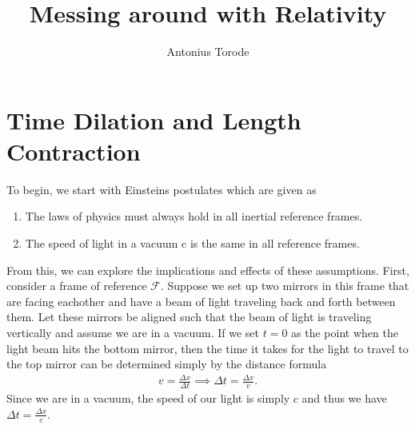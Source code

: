 \documentclass[11pt]{article}
\title{Messing around with Relativity}
\author{Antonius Torode}
\theoremstyle{definition}
\begin{document}
\maketitle

\section{Time Dilation and Length Contraction}
To begin, we start with Einsteins postulates which are given as
\begin{enumerate}
	\item The laws of physics must always hold in all inertial reference frames.
	\item The speed of light in a vacuum c is the same in all reference frames.
\end{enumerate}
From this, we can explore the implications and effects of these assumptions. First, consider a frame of reference $\mathcal{F}$. Suppose we set up two mirrors in this frame that are facing eachother and have a beam of light traveling back and forth between them. Let these mirrors be aligned such that the beam of light is traveling vertically and assume we are in a vacuum. If we set $t=0$ as the point when the light beam hits the bottom mirror, then the time it takes for the light to travel to the top mirror can be determined simply by the distance formula \begin{align}
v=\frac{\Delta x}{\Delta t} \implies \Delta t = \frac{\Delta x}{v}. \label{v=d/t}
\end{align} 
Since we are in a vacuum, the speed of our light is simply $c$ and thus we have $\Delta t = \frac{\Delta x}{c}$. 
\end{document}
